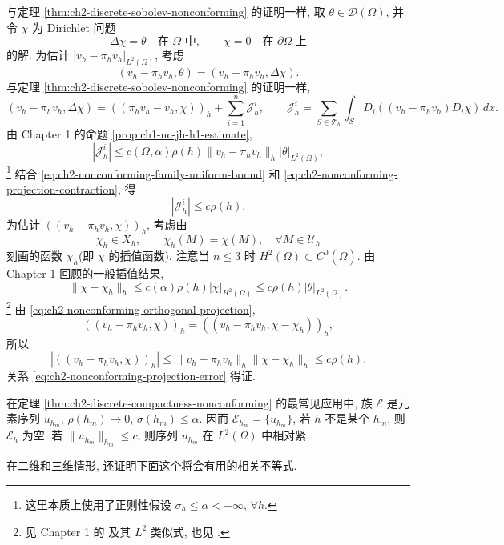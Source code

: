 \hypertarget{chapter-02-page-148}{}
\begin{Proof}
与定理 \ref{thm:ch2-discrete-sobolev-nonconforming} 的证明一样, 取 $\theta\in\mathcal D(\Omega)$, 并令 $\chi$ 为 Dirichlet 问题
\[
\Delta\chi=\theta\quad\text{在 }\Omega\text{ 中},
\qquad\chi=0\quad\text{在 }\partial\Omega\text{ 上}
\]
的解. 为估计 $|v_h-\pi_hv_h|_{L^2(\Omega)}$, 考虑
\[
(v_h-\pi_hv_h,\theta)=(v_h-\pi_hv_h,\Delta\chi).
\]
与定理 \ref{thm:ch2-discrete-sobolev-nonconforming} 的证明一样,
\begin{equation}
(v_h-\pi_hv_h,\Delta\chi)
=((\pi_hv_h-v_h,\chi))_h+\sum_{i=1}^{n}\mathcal J_h^i,
\qquad
\mathcal J_h^i=\sum_{S\in\mathcal T_h}\int_SD_i((v_h-\pi_hv_h)D_i\chi)\,dx.
\label{eq:ch2-nonconforming-projection-duality}
\end{equation}
由 Chapter 1 的命题 \ref{prop:ch1-nc-jh-h1-estimate},
\begin{equation}
|\mathcal J_h^i|
\leq c(\Omega,\alpha)\rho(h)
\lVert v_h-\pi_hv_h\rVert_h|\theta|_{L^2(\Omega)},
\label{eq:ch2-nonconforming-projection-boundary-term}
\end{equation}
\footnote{这里本质上使用了正则性假设 $\sigma_h\leq\alpha<+\infty$, $\forall h$.}
结合 \eqref{eq:ch2-nonconforming-family-uniform-bound} 和 \eqref{eq:ch2-nonconforming-projection-contraction}, 得
\begin{equation}
|\mathcal J_h^i|\leq c\rho(h).
\label{eq:ch2-nonconforming-projection-boundary-small}
\end{equation}
为估计 $((v_h-\pi_hv_h,\chi))_h$, 考虑由
\[
\chi_h\in X_h,
\qquad\chi_h(M)=\chi(M),\quad\forall M\in\mathcal U_h
\]
刻画的函数 $\chi_h$(即 $\chi$ 的插值函数). 注意当 $n\leq3$ 时 $H^2(\Omega)\subset C^0(\overline\Omega)$. 由 Chapter 1 回顾的一般插值结果,
\begin{equation}
\lVert\chi-\chi_h\rVert_h
\leq c(\alpha)\rho(h)|\chi|_{H^2(\Omega)}
\leq c\rho(h)|\theta|_{L^2(\Omega)}.
\label{eq:ch2-nonconforming-interpolation-error}
\end{equation}
\footnote{见 Chapter 1 的  及其 $L^2$ 类似式, 也见 .}
由 \eqref{eq:ch2-nonconforming-orthogonal-projection},
\[
((v_h-\pi_hv_h,\chi))_h
=((v_h-\pi_hv_h,\chi-\chi_h))_h,
\]
所以
\[
|((v_h-\pi_hv_h,\chi))_h|
\leq\lVert v_h-\pi_hv_h\rVert_h\lVert\chi-\chi_h\rVert_h
\leq c\rho(h).
\]
关系 \eqref{eq:ch2-nonconforming-projection-error} 得证.
\end{Proof}

\begin{Remark}
\label{rem:ch2-nonconforming-compactness-sequence}
在定理 \ref{thm:ch2-discrete-compactness-nonconforming} 的最常见应用中, 族 $\mathcal E$ 是元素序列 $u_{h_m}$, $\rho(h_m)\to0$, $\sigma(h_m)\leq\alpha$. 因而 $\mathcal E_{h_m}=\{u_{h_m}\}$, 若 $h$ 不是某个 $h_m$, 则 $\mathcal E_h$ 为空. 若 $\lVert u_{h_m}\rVert_{h_m}\leq c$, 则序列 $u_{h_m}$ 在 $L^2(\Omega)$ 中相对紧.
\end{Remark}

在二维和三维情形, 还证明下面这个将会有用的相关不等式.
